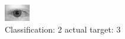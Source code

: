 \begin{figure}[h!]
\begin{center}
\includegraphics[width=0.60\columnwidth]{figures/ID594_class_2_target_3.png}
\end{center}
\caption{ Classification: 2 actual target: 3}
\label{fig:ID594_class_2_target_3}
\end{figure}
